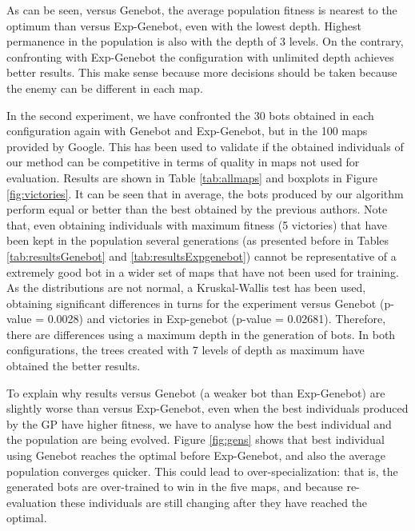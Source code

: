 {As can be seen, versus Genebot, the average population fitness is nearest to the optimum than versus Exp-Genebot, even with the lowest depth. Highest permanence in the population is also with the depth of 3 levels. On the contrary, confronting with Exp-Genebot the configuration with unlimited depth achieves better results. This make sense because more decisions should be taken because the enemy can be different in each map.

In the second experiment, we have confronted the 30 bots obtained in each configuration again with Genebot and Exp-Genebot, but in the 100 maps provided by Google. This has been used to validate if the obtained individuals of our method can be competitive in terms of quality in maps not used for evaluation. Results are shown in Table \ref{tab:allmaps} and boxplots in Figure \ref{fig:victories}. It can be seen that in average, the bots produced by our algorithm perform equal or better than the best obtained by the previous authors. Note that, even obtaining individuals with maximum fitness (5 victories) that have been kept in the population several generations (as presented 
before in Tables \ref{tab:resultsGenebot} and \ref{tab:resultsExpgenebot}) cannot be representative of a extremely good bot in a wider set of maps that have not been used for training. As the distributions are not normal, a Kruskal-Wallis test has been used, obtaining significant differences in turns for the experiment versus Genebot (p-value = 0.0028) and victories in Exp-genebot (p-value = 0.02681). Therefore, there are differences using a maximum depth in the generation of bots. In both configurations, the trees created with 7 levels of depth as maximum have obtained the better results.

To explain why results versus Genebot (a weaker bot than Exp-Genebot) are slightly worse than versus Exp-Genebot, even when the best individuals produced by the GP have higher fitness, we have to analyse how the best individual and the population are being evolved. Figure \ref{fig:gens} shows that best individual using Genebot reaches the optimal before Exp-Genebot, and also the average population converges quicker. This could lead to over-specialization: that is, the generated bots are over-trained to win in the five maps, and because re-evaluation these individuals are still changing after they have reached the optimal.



\begin{table}
\end{table}}
